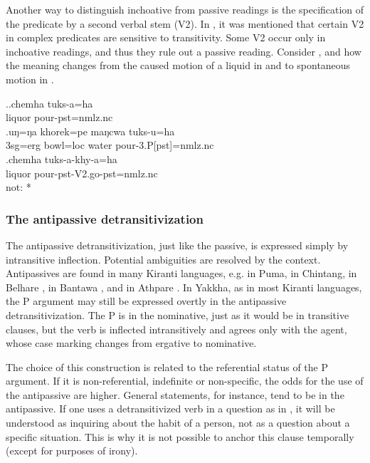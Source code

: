 Another way to distinguish inchoative from passive readings is the specification of the predicate by a second verbal stem (V2). In , it was mentioned that certain V2 in complex predicates are sensitive to transitivity. Some V2 occur only in inchoative readings, and thus they rule out a  passive reading. Consider \Next, and how the meaning changes from the caused motion of a liquid in \Next[a] and \Next[b] to spontaneous motion in \Next[c].

\ex.\ag.chemha tuks-a=ha\\
liquor pour{\sc [3sg]-pst=nmlz.nc} \\
\bg.uŋ=ŋa khorek=pe maŋcwa tuks-u=ha\\
{\sc 3sg=erg} bowl{\sc =loc} water pour{\sc -3.P[pst]=nmlz.nc}\\
\bg.chemha tuks-a-khy-a=ha\\
liquor pour{\sc [3sg]-pst-V2.go-pst=nmlz.nc} \\
 not: *


\subsubsection{The antipassive detransitivization}\label{detr-antip}

The antipassive detransitivization, just like the passive, is expressed simply by intransitive inflection. Potential ambiguities are  resolved by the context. Antipassives are  found in many Kiranti languages, e.g. in Puma, in Chintang, in Belhare \citep{Bickel2011Detrans, Schikowski2013_Thesis}, in Bantawa \citep[221ff.]{Doornenbal2009A-grammar}, and in Athpare \citep[122]{Ebert1997A-grammar}. In Yakkha, as in most Kiranti languages, the P argument may still be expressed overtly in the antipassive detransitivization. The P is in the nominative, just as it would be in transitive clauses, but the verb is inflected intransitively and agrees only with the agent, whose case marking changes from ergative to nominative.

The choice of this construction is related to the referential status of the P argument. If it is non-referential, indefinite or non-specific, the odds for the use of the antipassive are higher. General statements, for instance,  tend to be in the antipassive. If one uses a detransitivized verb in a question as in \Next, it will be understood as inquiring about the habit of a person, not as a question about a specific situation. This is why it is not possible to anchor this clause temporally (except for purposes of irony). 


